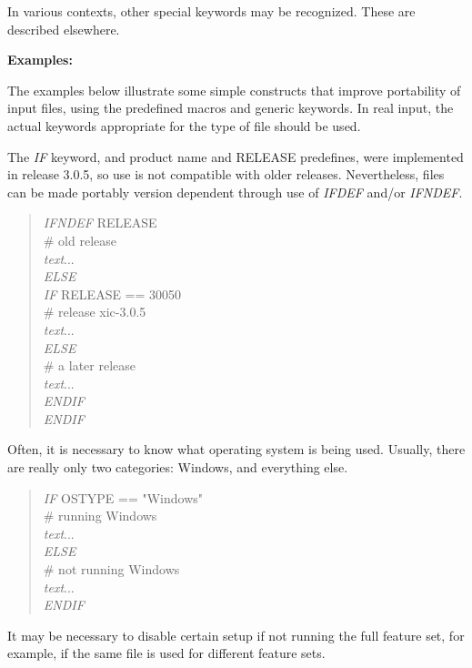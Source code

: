 In various contexts, other special keywords may be recognized.
These are described elsewhere.

{\bf Examples:}

The examples below illustrate some simple constructs that improve
portability of input files, using the predefined macros and generic
keywords.  In real input, the actual keywords appropriate for the type
of file should be used.

The {\it IF} keyword, and product name and {\vt RELEASE} predefines,
were implemented in release 3.0.5, so use is not compatible with older
releases.  Nevertheless, files can be made portably version dependent
through use of {\it IFDEF} and/or {\it IFNDEF\/}.

\begin{quote}
{\it IFNDEF} {\vt RELEASE}\\
\# old release\\
{\it text\/}...\\
{\it ELSE}\\
{\it IF} {\vt RELEASE == 30050}\\
\# release xic-3.0.5\\
{\it text\/}...\\
{\it ELSE}\\
\# a later release\\
{\it text\/}...\\
{\it ENDIF}\\
{\it ENDIF}\\
\end{quote}

Often, it is necessary to know what operating system is being used. 
Usually, there are really only two categories:  Windows, and
everything else.

\begin{quote}
{\it IF} {\vt OSTYPE == "Windows"}\\
\# running Windows\\
{\it text\/}...\\
{\it ELSE}\\
\# not running Windows\\
{\it text\/}...\\
{\it ENDIF}\\
\end{quote}

It may be necessary to disable certain setup if not running the full
{\Xic} feature set, for example, if the same file is used for
different {\Xic} feature sets.

